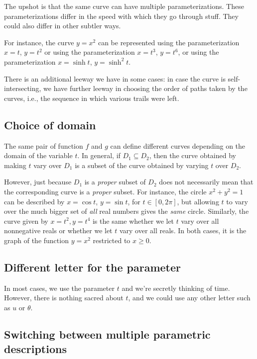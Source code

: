 \documentclass[10pt]{amsart}
\begin{document}
The upshot is that the same curve can have multiple
parameterizations. These parameterizations differ in the speed with
which they go through stuff. They could also differ in other subtler
ways.

For instance, the curve $y = x^2$ can be represented using the
parameterization $x = t$, $y = t^2$ or using the parameterization $x =
t^3$, $y = t^6$, or using the parameterization $x = \sinh t$, $y =
\sinh^2 t$.

There is an additional leeway we have in some cases: in case the curve
is self-intersecting, we have further leeway in choosing the order of
paths taken by the curves, i.e., the sequence in which various trails
were left.
\subsection{Choice of domain}

The same pair of function $f$ and $g$ can define different curves
depending on the domain of the variable $t$. In general, if $D_1
\subseteq D_2$, then the curve obtained by making $t$ vary over $D_1$
is a subset of the curve obtained by varying $t$ over $D_2$.

However, just because $D_1$ is a {\em proper} subset of $D_2$ does not
necessarily mean that the corresponding curve is a {\em proper}
subset. For instance, the circle $x^2 + y^2 = 1$ can be described by
$x = \cos t$, $y = \sin t$, for $t \in [0,2\pi]$, but allowing $t$ to
vary over the much bigger set of {\em all} real numbers gives the {\em
same} circle. Similarly, the curve given by $x = t^2, y = t^4$ is the
same whether we let $t$ vary over all nonnegative reals or whether we
let $t$ vary over all reals. In both cases, it is the graph of the
function $y = x^2$ restricted to $x \ge 0$.

\subsection{Different letter for the parameter}

In most cases, we use the parameter $t$ and we're secretly thinking of
time. However, there is nothing sacred about $t$, and we could use any
other letter such as $u$ or $\theta$.

\subsection{Switching between multiple parametric descriptions}
\end{document}
